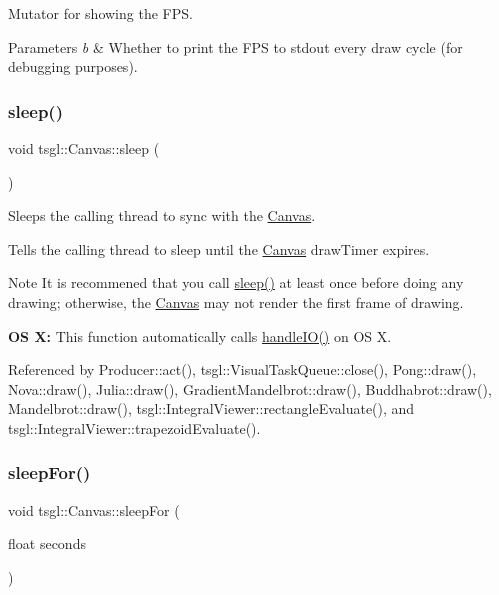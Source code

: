 Mutator for showing the F\+PS. 


\begin{DoxyParams}{Parameters}
{\em b} & Whether to print the F\+PS to stdout every draw cycle (for debugging purposes). \\
\hline
\end{DoxyParams}
\mbox{\label{classtsgl_1_1_canvas_a2604fa056d4541f918ccf447eda1f3cf}} 
\subsubsection{\texorpdfstring{sleep()}{sleep()}}
{\footnotesize\ttfamily void tsgl\+::\+Canvas\+::sleep (\begin{DoxyParamCaption}{ }\end{DoxyParamCaption})}



Sleeps the calling thread to sync with the \hyperlink{classtsgl_1_1_canvas}{Canvas}. 

Tells the calling thread to sleep until the \hyperlink{classtsgl_1_1_canvas}{Canvas}\textquotesingle{} draw\+Timer expires. \begin{DoxyNote}{Note}
It is recommened that you call \hyperlink{classtsgl_1_1_canvas_a2604fa056d4541f918ccf447eda1f3cf}{sleep()} at least once before doing any drawing; otherwise, the \hyperlink{classtsgl_1_1_canvas}{Canvas} may not render the first frame of drawing. 

{\bfseries OS X\+:} This function automatically calls \hyperlink{classtsgl_1_1_canvas_aa499851e5e4b97bb99ca4fb3d633c17e}{handle\+I\+O()} on OS X. 
\end{DoxyNote}


Referenced by Producer\+::act(), tsgl\+::\+Visual\+Task\+Queue\+::close(), Pong\+::draw(), Nova\+::draw(), Julia\+::draw(), Gradient\+Mandelbrot\+::draw(), Buddhabrot\+::draw(), Mandelbrot\+::draw(), tsgl\+::\+Integral\+Viewer\+::rectangle\+Evaluate(), and tsgl\+::\+Integral\+Viewer\+::trapezoid\+Evaluate().

\mbox{\label{classtsgl_1_1_canvas_a6674cc86b9a54b6a564021fddce47e36}} 
\subsubsection{\texorpdfstring{sleep\+For()}{sleepFor()}}
{\footnotesize\ttfamily void tsgl\+::\+Canvas\+::sleep\+For (\begin{DoxyParamCaption}\item[{float}]{seconds }\end{DoxyParamCaption})}



